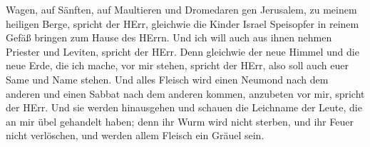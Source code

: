 Wagen, auf Sänften, auf Maultieren und Dromedaren gen Jerusalem, zu
meinem heiligen Berge, spricht der HErr, gleichwie die Kinder Israel
Speisopfer in reinem Gefäß bringen zum Hause des HErrn. 
Und ich will auch aus ihnen nehmen Priester und Leviten, spricht der
HErr.  Denn gleichwie der neue Himmel und die neue Erde,
die ich mache, vor mir stehen, spricht der HErr, also soll auch euer
Same und Name stehen.  Und alles Fleisch wird einen Neumond
nach dem anderen und einen Sabbat nach dem anderen kommen, anzubeten vor
mir, spricht der HErr.  Und sie werden hinausgehen und
schauen die Leichname der Leute, die an mir übel gehandelt haben; denn
ihr Wurm wird nicht sterben, und ihr Feuer nicht verlöschen, und werden
allem Fleisch ein Gräuel sein.
